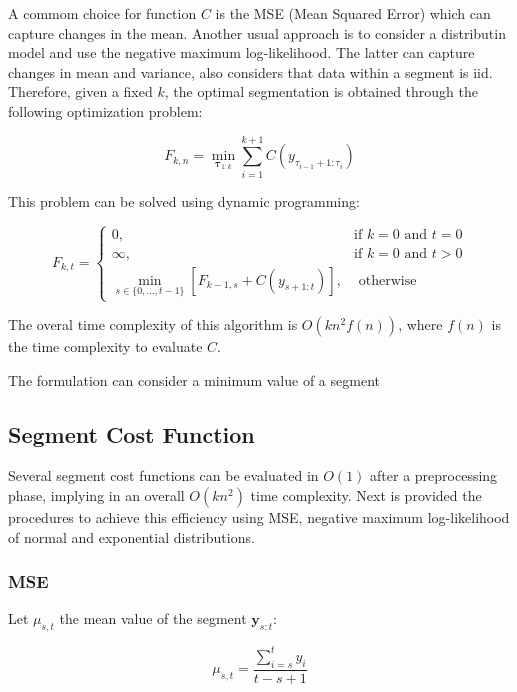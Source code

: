 A commom choice for function $C$ is the MSE (Mean Squared Error) which can capture changes in the mean. Another usual approach is to consider a distributin model and use the negative maximum log-likelihood. The latter can capture changes in mean and variance, also considers that data within a segment is iid. Therefore, given a fixed $k$, the optimal segmentation is obtained through the following optimization problem: 

\begin{equation}
    F_{k, n} = \min_{\boldsymbol \tau_{1 : k}} \sum \limits_{i = 1}^{k + 1} C(y_{\tau_{i - 1} + 1 : \tau_{i}})
\end{equation}

This problem can be solved using dynamic programming:

\begin{equation}
    F_{k, t} = 
    \begin{cases}
        0, & \text{if } k = 0 \text{ and } t = 0 \\
        \infty, & \text{if } k = 0 \text{ and } t > 0 \\
        \displaystyle \min_{s \in \{0, ..., t - 1\}} \left[ F_{k - 1, s} + C(y_{s + 1 : t}) \right], & \text{ otherwise}
    \end{cases}
\end{equation}

The overal time complexity of this algorithm is $O(k n^2 f(n))$, where $f(n)$ is the time complexity to evaluate $C$.

The formulation can consider a minimum value of a segment

\subsection{Segment Cost Function}

Several segment cost functions can be evaluated in $O(1)$ after a preprocessing phase, implying in an overall $O(k n^2)$ time complexity. Next is provided the procedures to achieve this efficiency using MSE, negative maximum log-likelihood of normal and exponential distributions.

\subsubsection{MSE}

Let $\mu_{s, t}$ the mean value of the segment $\mathbf{y}_{s : t}$:

\begin{equation}
    \mu_{s, t} = \frac{\sum \limits_{i = s}^{t} y_{i}}{t - s + 1}
\end{equation}

